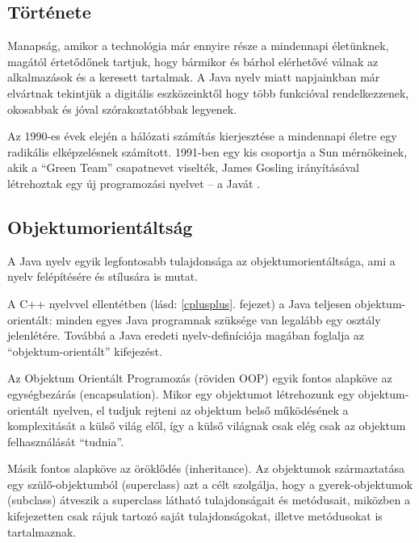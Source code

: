 \documentclass[a4paper,12pt]{report}
\begin{document}



\subsection{Története}
\label{javahistory}

Manapság, amikor a technológia már ennyire része a mindennapi életünknek, magától értetődőnek tartjuk, hogy bármikor és bárhol elérhetővé válnak az alkalmazások és a keresett tartalmak. A Java nyelv miatt napjainkban már elvártnak tekintjük a digitális eszközeinktől hogy több funkcióval rendelkezzenek, okosabbak és jóval szórakoztatóbbak legyenek.

\vspace{2mm}
Az 1990-es évek elején a hálózati számítás kierjesztése a mindennapi életre egy radikális elképzelésnek számított. 1991-ben egy kis csoportja a Sun mérnökeinek, akik a ``Green Team'' csapatnevet viselték, James Gosling irányításával létrehoztak egy új programozási nyelvet -- a Javát \cite{javahistory}.

\subsection{Objektumorientáltság}
\label{oo}

A Java nyelv egyik legfontosabb tulajdonsága az objektumorientáltsága, ami a nyelv felépítésére és stílusára is mutat. 

\vspace{2mm}
A C++ nyelvvel ellentétben (lásd: \ref{cplusplus}. fejezet) a Java teljesen objektum-orientált: minden egyes Java programnak szüksége van legalább egy osztály jelenlétére. Továbbá a Java eredeti nyelv-definíciója magában foglalja az ``objektum-orientált'' kifejezést.

\vspace{2mm}
Az Objektum Orientált Programozás (röviden OOP) egyik fontos alapköve az egységbezárás (encapsulation). Mikor egy objektumot létrehozunk egy objektum-orientált nyelven, el tudjuk rejteni az objektum belső működésének a komplexitását a külső világ elől, így a külső világnak csak elég csak az objektum felhasználását ``tudnia''.

\vspace{2mm}
Másik fontos alapköve az öröklődés (inheritance). Az objektumok származtatása egy szülő-objektumból (superclass) azt a célt szolgálja, hogy a gyerek-objektumok (subclass) átveszik a superclass látható tulajdonságait és metódusait, miközben a kifejezetten csak rájuk tartozó saját tulajdonságokat, illetve metódusokat is tartalmaznak.
\end{document}

